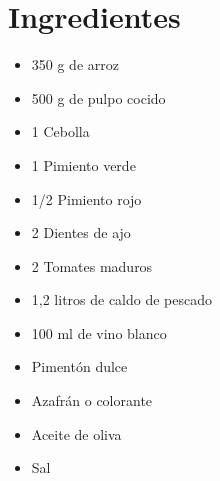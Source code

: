 
    \begin{minipage}[t]{0.35\textwidth}
        \section*{Ingredientes}
        \begin{itemize}[leftmargin=*]
            \item 350 g de arroz
            \item 500 g de pulpo cocido
            \item 1 Cebolla
            \item 1 Pimiento verde
            \item 1/2 Pimiento rojo
            \item 2 Dientes de ajo
            \item 2 Tomates maduros
            \item 1,2 litros de caldo de pescado
            \item 100 ml de vino blanco
            \item Pimentón dulce
            \item Azafrán o colorante
            \item Aceite de oliva
            \item Sal
        \end{itemize}
    \end{minipage}
    \hfill
